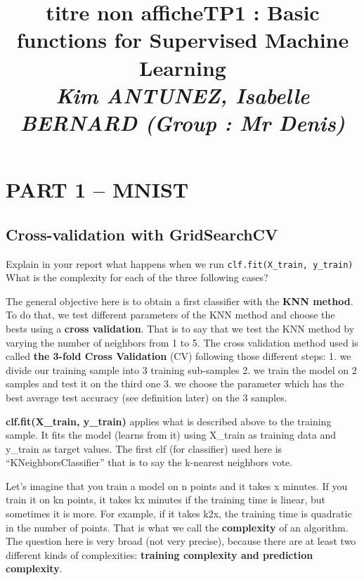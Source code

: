 \documentclass[10pt,a4paper]{article}
\title{titre non affiche}
\author{}
\date{}
\title{\textbf{TP1 : Basic functions for Supervised Machine Learning  } \medskip \\ \large \emph{Kim ANTUNEZ, Isabelle BERNARD (Group : Mr Denis)}}
\author{}
\theoremstyle{break}
\begin{document}
\maketitle


\vspace{-20truemm}

\hypertarget{part-1-mnist}{%
\section{PART 1 -- MNIST}\label{part-1-mnist}}

\hypertarget{cross-validation-with-gridsearchcv}{%
\subsection{Cross-validation with GridSearchCV}\label{cross-validation-with-gridsearchcv}}

\begin{tcolorbox}

Explain in your report what happens when we run \texttt{clf.fit(X\_train,\ y\_train)}
What is the complexity for each of the three following cases?

\end{tcolorbox}

The general objective here is to obtain a first classifier with the \textbf{KNN method}. To do that, we test different parameters of the KNN method and choose the bests using a \textbf{cross validation}. That is to say that we test the KNN method by varying the number of neighbors from 1 to 5. The cross validation method used is called \textbf{the 3-fold Cross Validation} (CV) following those different steps:
1. we divide our training sample into 3 training sub-samples
2. we train the model on 2 samples and test it on the third one
3. we choose the parameter which has the best average test accuracy (see definition later) on the 3 samples.

\textbf{clf.fit(X\_train, y\_train)} applies what is described above to the training sample. It fits the model (learns from it) using X\_train as training data and y\_train as target values. The first clf (for classifier) used here is ``KNeighborsClassifier'' that is to say the k-nearest neighbors vote.

Let's imagine that you train a model on n points and it takes x minutes. If you train it on kn points, it takes kx minutes if the training time is linear, but sometimes it is more. For example, if it takes k2x, the training time is quadratic in the number of points. That is what we call the \textbf{complexity} of an algorithm. The question here is very broad (not very precise), because there are at least two different kinds of complexities: \textbf{training complexity and prediction complexity}.
\end{document}
